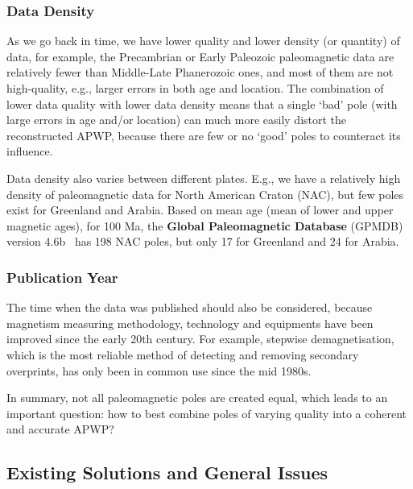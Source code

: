 \subsubsection{Data Density}

As we go back in time, we have lower quality and lower density (or quantity) of
data, for example, the Precambrian or Early Paleozoic paleomagnetic data are
relatively fewer than Middle-Late Phanerozoic ones, and most of them are not
high-quality, e.g., larger errors in both age and location. The combination of
lower data quality with lower data density means that a single `bad' pole (with
large errors in age and/or location) can much more easily distort the
reconstructed APWP, because there are few or no `good' poles to counteract its
influence.

Data density also varies between different plates. E.g., we have a relatively
high density of paleomagnetic data for North American Craton (NAC), but few
poles exist for Greenland and Arabia. Based on mean age (mean of lower and
upper magnetic ages), for 100 Ma, the \textbf{Global Paleomagnetic
Database} (GPMDB) version 4.6b~\cite{P05} has 198 NAC poles, but only 17 for
Greenland and 24 for Arabia.

\subsubsection{Publication Year}

The time when the data was published should also be considered, because
magnetism measuring methodology, technology and equipments have been improved
since the early 20th century. For example, stepwise demagnetisation, which is
the most reliable method of detecting and removing secondary overprints, has
only been in common use since the mid 1980s.

In summary, not all paleomagnetic poles are created equal, which leads to an
important question: how to best combine poles of varying quality into a
coherent and accurate APWP\@?

\subsection{Existing Solutions and General Issues}

